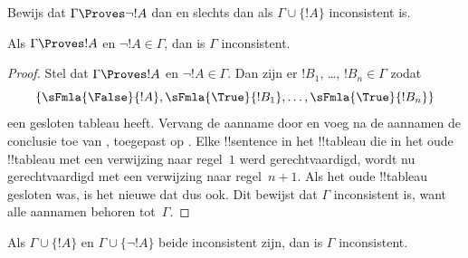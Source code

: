 \documentclass[openany]{memoir}
\begin{document}
\begin{prob}
Bewijs dat $\Gamma \Proves \lnot !A$ dan en slechts dan als
$\Gamma \cup \{!A\}$ inconsistent is.
\end{prob}

\begin{prop}
  Als $\Gamma \Proves !A$ en $\lnot !A \in \Gamma$, dan is $\Gamma$
  inconsistent.
\end{prop}

\begin{proof}
  Stel dat $\Gamma \Proves !A$ en $\lnot !A \in \Gamma$. Dan zijn er
  $!B_1$, \dots, $!B_n \in \Gamma$ zodat \
  \[
  \{\sFmla{\False}{!A}, \sFmla{\True}{!B_1}, \dots, \sFmla{\True}{!B_n}\}
  \]
  een gesloten tableau heeft. Vervang de aanname
   door  en voeg na de
  aannamen de conclusie toe van \TRule{\True}{\lnot}, toegepast op
  \sFmla{\False}{!A}. Elke !!{sentence} in het !!{tableau} die in het
  oude !!{tableau} met een verwijzing naar regel~$1$ werd
  gerechtvaardigd, wordt nu gerechtvaardigd met een verwijzing naar
  regel~$n+1$. Als het oude !!{tableau} gesloten was, is het nieuwe dat
  dus ook. Dit bewijst dat $\Gamma$ inconsistent is, want alle aannamen
  behoren tot~$\Gamma$.
\end{proof}

\begin{prop}
  Als $\Gamma \cup \{!A\}$ en $\Gamma \cup \{\lnot !A\}$ beide
  inconsistent zijn, dan is $\Gamma$ inconsistent.
\end{prop}
\end{document}
